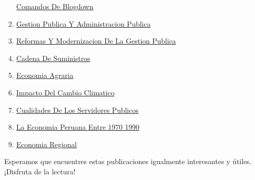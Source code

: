\documentclass[
  stu,
  floatsintext,
  longtable,
  a4paper,
  nolmodern,
  notxfonts,
  notimes,
  colorlinks=true,linkcolor=blue,citecolor=blue,urlcolor=blue]{apa7}
\begin{document}
\begin{enumerate}
  \href{https://achalmaedison.netlify.app/blog/posts/2021-07-14-comandos-de-blogdown/index.pdf}{}
  \href{https://achalmaedison.netlify.app/blog/posts/2021-07-14-comandos-de-blogdown}{Comandos
  De Blogdown}
\item
  \href{https://achalmaedison.netlify.app/blog/posts/2021-10-01-gestion-publica-y-administracion-publica/index.pdf}{}
  \href{https://achalmaedison.netlify.app/blog/posts/2021-10-01-gestion-publica-y-administracion-publica}{Gestion
  Publica Y Administracion Publica}
\item
  \href{https://achalmaedison.netlify.app/blog/posts/2021-10-01-reformas-y-modernizacion-de-la-gestion-publica/index.pdf}{}
  \href{https://achalmaedison.netlify.app/blog/posts/2021-10-01-reformas-y-modernizacion-de-la-gestion-publica}{Reformas
  Y Modernizacion De La Gestion Publica}
\item
  \href{https://achalmaedison.netlify.app/blog/posts/2022-01-23-cadena\%20de\%20suministros/index.pdf}{}
  \href{https://achalmaedison.netlify.app/blog/posts/2022-01-23-cadena\%20de\%20suministros}{Cadena
  De Suministros}
\item
  \href{https://achalmaedison.netlify.app/blog/posts/2022-04-22-economia-agraria/index.pdf}{}
  \href{https://achalmaedison.netlify.app/blog/posts/2022-04-22-economia-agraria}{Economia
  Agraria}
\item
  \href{https://achalmaedison.netlify.app/blog/posts/2022-06-02-impacto-del-cambio-climatico/index.pdf}{}
  \href{https://achalmaedison.netlify.app/blog/posts/2022-06-02-impacto-del-cambio-climatico}{Impacto
  Del Cambio Climatico}
\item
  \href{https://achalmaedison.netlify.app/blog/posts/2023-05-11-cualidades-de-los-servidores-publicos/index.pdf}{}
  \href{https://achalmaedison.netlify.app/blog/posts/2023-05-11-cualidades-de-los-servidores-publicos}{Cualidades
  De Los Servidores Publicos}
\item
  \href{https://achalmaedison.netlify.app/blog/posts/2023-05-12-la-economia-peruana-entre-1970-1990/index.pdf}{}
  \href{https://achalmaedison.netlify.app/blog/posts/2023-05-12-la-economia-peruana-entre-1970-1990}{La
  Economia Peruana Entre 1970 1990}
\item
  \href{https://achalmaedison.netlify.app/blog/posts/2023-05-16-economia-regional/index.pdf}{}
  \href{https://achalmaedison.netlify.app/blog/posts/2023-05-16-economia-regional}{Economia
  Regional}
\end{enumerate}

Esperamos que encuentres estas publicaciones igualmente interesantes y
útiles. ¡Disfruta de la lectura!
\end{document}

